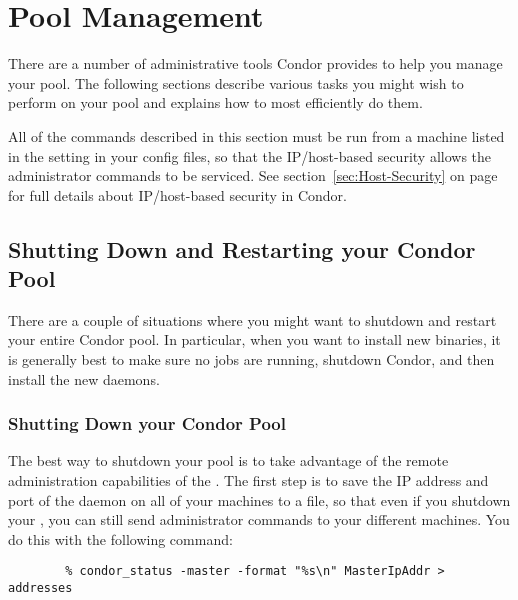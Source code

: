 \section{\label{sec:Pool-Management}Pool Management}

There are a number of administrative tools Condor provides to help you
manage your pool.
The following sections describe various tasks you might wish to
perform on your pool and explains how to most efficiently do them. 

All of the commands described in this section must be run from a
machine listed in the  setting in
your config files, so that the IP/host-based security allows the
administrator commands to be serviced.
See section~\ref{sec:Host-Security} on
page~\pageref{sec:Host-Security} for full details about IP/host-based
security in Condor.

\subsection{\label{sec:Pool-Shutdown-and-Restart}
Shutting Down and Restarting your Condor Pool}

There are a couple of situations where you might want to shutdown and
restart your entire Condor pool.
In particular, when you want to install new binaries, it is generally
best to make sure no jobs are running, shutdown Condor, and then
install the new daemons.

\subsubsection{\label{sec:Pool-Shutdown}Shutting Down your Condor Pool}

The best way to shutdown your pool is to take advantage of the remote
administration capabilities of the .
The first step is to save the IP address and port of the
 daemon on all of your machines to a file, so that 
even if you shutdown your , you can still send
administrator commands to your different machines.
You do this with the following command:
\begin{verbatim}
        % condor_status -master -format "%s\n" MasterIpAddr > addresses
\end{verbatim}

